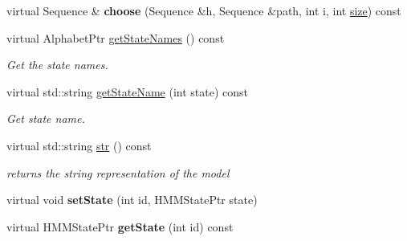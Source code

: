 \begin{DoxyCompactItemize}
\mbox{\label{classtops_1_1ProfileHiddenMarkovModel_a491a9b0d4fe84c84180680a8927a3f57}} 
virtual Sequence \& {\bfseries choose} (Sequence \&h, Sequence \&path, int i, int \hyperlink{classtops_1_1ProbabilisticModel_a4e3910e9b9b848b7078e7101909ae82a}{size}) const
\item 
\mbox{\label{classtops_1_1ProfileHiddenMarkovModel_a7c59739456d35ffcd782326c523cce4e}} 
virtual Alphabet\+Ptr \hyperlink{classtops_1_1ProfileHiddenMarkovModel_a7c59739456d35ffcd782326c523cce4e}{get\+State\+Names} () const
\begin{DoxyCompactList}\small\item\em Get the state names. \end{DoxyCompactList}\item 
\mbox{\label{classtops_1_1ProfileHiddenMarkovModel_acf00774f9900d8b031905341b09fc1ef}} 
virtual std\+::string \hyperlink{classtops_1_1ProfileHiddenMarkovModel_acf00774f9900d8b031905341b09fc1ef}{get\+State\+Name} (int state) const
\begin{DoxyCompactList}\small\item\em Get state name. \end{DoxyCompactList}\item 
\mbox{\label{classtops_1_1ProfileHiddenMarkovModel_a99c93caef1d08945a7d30d9eb10de75c}} 
virtual std\+::string \hyperlink{classtops_1_1ProfileHiddenMarkovModel_a99c93caef1d08945a7d30d9eb10de75c}{str} () const
\begin{DoxyCompactList}\small\item\em returns the string representation of the model \end{DoxyCompactList}\item 
\mbox{\label{classtops_1_1ProfileHiddenMarkovModel_a40ab0d96f06ee31bd226c05aec9092ff}} 
virtual void {\bfseries set\+State} (int id, H\+M\+M\+State\+Ptr state)
\item 
\mbox{\label{classtops_1_1ProfileHiddenMarkovModel_a0fb59d1ad6f370a6434c1fe1ab2253cb}} 
virtual H\+M\+M\+State\+Ptr {\bfseries get\+State} (int id) const

\end{DoxyCompactItemize}
